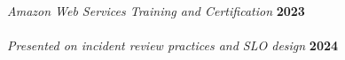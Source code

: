 \\
\textit{Amazon Web Services Training and Certification} \hfill {\bf 2023}\\

\\
\textit{Presented on incident review practices and SLO design} \hfill {\bf 2024}\\
